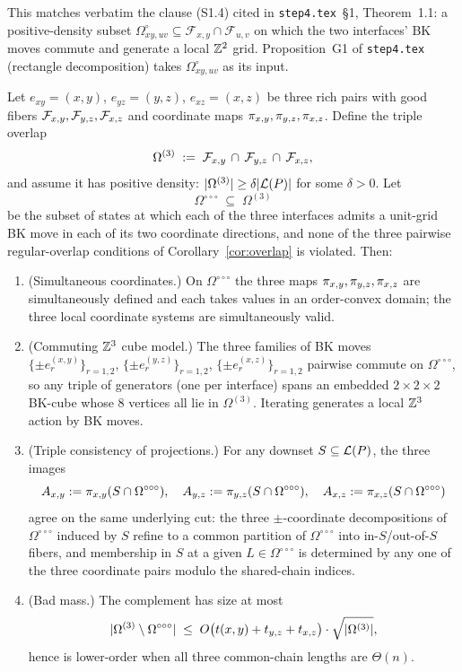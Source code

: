 \begin{remark}
This matches verbatim the clause \textup{(S1.4)} cited in
\texttt{step4.tex}~\S1, Theorem~1.1: a positive-density subset
$\Omega^{\circ}_{xy,uv}\subseteq\mathcal F_{x,y}\cap\mathcal F_{u,v}$
on which the two interfaces' BK moves commute and generate a local
$\mathbb{Z}^2$ grid. Proposition~G1 of \texttt{step4.tex} (rectangle decomposition)
takes $\Omega^{\circ}_{xy,uv}$ as its input.
\end{remark}
\begin{corollary}\label{cor:triple-overlap}
Let $e_{xy}=(x,y)$, $e_{yz}=(y,z)$, $e_{xz}=(x,z)$ be three rich pairs with
good fibers $\mathcal{F}_{x,y},\mathcal{F}_{y,z},\mathcal{F}_{x,z}$ and coordinate maps
$\pi_{x,y},\pi_{y,z},\pi_{x,z}$. Define the triple overlap
\[
\Omega^{(3)} \;:=\; \mathcal{F}_{x,y}\,\cap\,\mathcal{F}_{y,z}\,\cap\,\mathcal{F}_{x,z},
\]
and assume it has positive density: $|\Omega^{(3)}|\ge\delta|\mathcal{L}(P)|$ for some
$\delta>0$. Let
\[
\Omega^{\circ\circ\circ} \;\subseteq\; \Omega^{(3)}
\]
be the subset of states at which each of the three interfaces admits a
unit-grid BK move in each of its two coordinate directions, and none of the
three pairwise regular-overlap conditions of Corollary~\ref{cor:overlap} is
violated. Then:
\begin{enumerate}[label=(\alph*),nosep]
\item\label{it:tri-coords}
(Simultaneous coordinates.) On $\Omega^{\circ\circ\circ}$ the three maps
$\pi_{x,y},\pi_{y,z},\pi_{x,z}$ are simultaneously defined and each takes values in
an order-convex domain; the three local coordinate systems are simultaneously
valid.
\item\label{it:tri-cube}
(Commuting $\mathbb{Z}^3$ cube model.) The three families of BK moves
$\{\pm e_r^{(x,y)}\}_{r=1,2}$, $\{\pm e_r^{(y,z)}\}_{r=1,2}$,
$\{\pm e_r^{(x,z)}\}_{r=1,2}$ pairwise commute on
$\Omega^{\circ\circ\circ}$, so any triple of generators (one per interface)
spans an embedded $2\times 2\times 2$ BK-cube whose $8$ vertices all lie in
$\Omega^{(3)}$. Iterating generates a local $\mathbb{Z}^3$ action by BK moves.
\item\label{it:tri-consistency}
(Triple consistency of projections.) For any downset $S\subseteq\mathcal{L}(P)$, the three
images
\[
A_{x,y}:=\pi_{x,y}(S\cap\Omega^{\circ\circ\circ}),\quad
A_{y,z}:=\pi_{y,z}(S\cap\Omega^{\circ\circ\circ}),\quad
A_{x,z}:=\pi_{x,z}(S\cap\Omega^{\circ\circ\circ})
\]
agree on the same underlying cut: the three $\pm$-coordinate decompositions
of $\Omega^{\circ\circ\circ}$ induced by $S$ refine to a common partition of
$\Omega^{\circ\circ\circ}$ into in-$S$/out-of-$S$ fibers, and membership in
$S$ at a given $L\in\Omega^{\circ\circ\circ}$ is determined by any one of the
three coordinate pairs modulo the shared-chain indices.
\item\label{it:tri-bad}
(Bad mass.) The complement has size at most
\[
|\Omega^{(3)}\setminus\Omega^{\circ\circ\circ}|
\;\le\;
O\bigl(t(x,y)+t_{y,z}+t_{x,z}\bigr)\cdot\sqrt{|\Omega^{(3)}|},
\]
hence is lower-order when all three common-chain lengths are $\Theta(n)$.
\end{enumerate}
\end{corollary}

